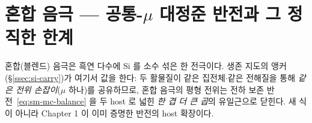 \section{혼합 음극 --- 공통-$\mu$ 대정준 반전과 그 정직한 한계}\label{sec:si-blend}
혼합(블렌드) 음극은 흑연 다수에 Si 를 소수 섞은 한 전극이다. 생존 지도의 앵커(\S\ref{ssec:si-carry})가
여기서 값을 한다: 두 활물질이 같은 집전체$\cdot$같은 전해질을 통해 \emph{같은 전위 손잡이}($\mu$ 하나)를
공유하므로, 혼합 음극의 평형 전위는 전하 보존 반전~\eqref{eq:sm-mc-balance} 을 두 host 로 넓힌 \emph{한
겹 더 큰 곱}의 유일근으로 닫힌다. 새 식이 아니라 Chapter 1 이 이미 증명한 반전의 host 확장이다.

